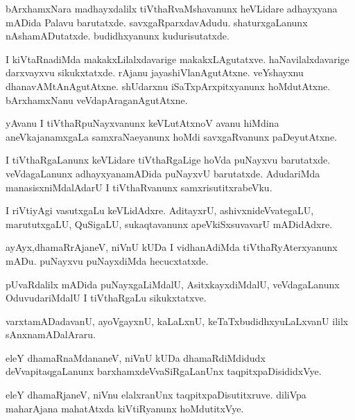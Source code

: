 \documentclass{article}
\begin{document}
\begin{mn}
bArxhamxNara madhayxdalilx tiVthaRvaMshavanunx heVLidare adhayxyana mADida Palavu barutatxde. 
savxgaRparxdavAdudu. shaturxgaLanunx nAshamADutatxde. budidhxyanunx kudurisutatxde.
\end{mn}

\begin{mn}
I kiVtaRnadiMda makakxLilalxdavarige makakxLAgutatxve. haNavilalxdavarige darxvayxvu 
sikukxtatxde. rAjanu jayashiVlanAgutAtxne. veYshayxnu dhanavAMtAnAgutAtxne. shUdarxnu 
iSaTxpArxpitxyanunx hoMdutAtxne. bArxhamxNanu veVdapAraganAgutAtxne.
\end{mn}

\begin{mn}
yAvanu I tiVthaRpuNayxvanunx keVLutAtxnoV avanu hiMdina aneVkajanamxgaLa samxraNaeyanunx hoMdi 
savxgaRvanunx paDeyutAtxne.
\end{mn}

\begin{mn}
I tiVthaRgaLanunx keVLidare tiVthaRgaLige hoVda puNayxvu barutatxde. veVdagaLanunx adhayxyanamADida
puNayxvU barutatxde. AdudariMda manasisxniMdalAdarU I tiVthaRvanunx samxrisutitxrabeVku.
\end{mn}

\begin{mn}
I riVtiyAgi vasutxgaLu keVLidAdxre. AditayxrU, ashivxnideVvategaLU, marututxgaLU, QuSigaLU, 
sukaqtavanunx apeVkiSxsuvavarU mADidAdxre.
\end{mn}

\begin{mn}
ayAyx,dhamaRrAjaneV, niVnU kUDa I vidhanAdiMda tiVthaRyAterxyanunx mADu. puNayxvu puNayxdiMda 
hecucxtatxde.
\end{mn}

\begin{mn}
pUvaRdalilx mADida puNayxgaLiMdalU, AsitxkayxdiMdalU, veVdagaLanunx OduvudariMdalU I tiVthaRgaLu 
sikukxtatxve.
\end{mn}

\begin{mn}
varxtamADadavanU, ayoVgayxnU, kaLaLxnU, keTaTxbudidhxyuLaLxvanU ililx sAnxnamADalAraru.
\end{mn}

\begin{mn}
eleY dhamaRnaMdananeV, niVnU kUDa dhamaRdiMdidudx deVvapitaqgaLanunx 
barxhamxdeVvaSiRgaLanUnx taqpitxpaDisididxVye.
\end{mn}

\begin{mn}
eleY dhamaRjaneV, niVnu elalxranUnx taqpitxpaDisutitxruve. diliVpa maharAjana mahatAtxda 
kiVtiRyanunx  hoMdutitxVye.
\end{mn}
\end{document}
